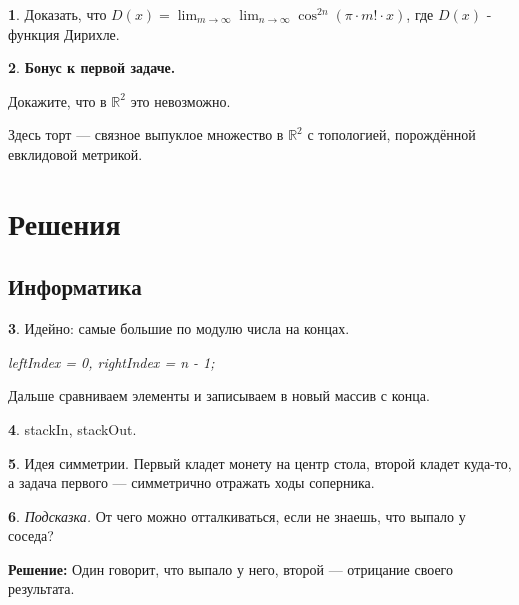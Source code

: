 \documentclass[14pt, a4paper]{extarticle}
\theoremstyle{definition}
\newtheorem{problem}{}
\theoremstyle{definition}
\theoremstyle{remark}
\numberwithin{equation}{section}
\newcommand{\R}{\ensuremath{\mathbb{R}}}
\begin{document}
\begin{problem}
    Доказать, что $D(x) = \displaystyle\lim_{m\to\infty}{\lim_{n\to\infty}
    {\cos^{2n}(\pi \cdot m! \cdot x)}}$, где $D(x)$ - функция Дирихле.
\end{problem}

\begin{problem}
    \textbf{Бонус к первой задаче.}

    Докажите, что в $\R^2$ это невозможно.

    Здесь торт --- связное выпуклое множество в $\R^2$ 
    с топологией, порождённой евклидовой метрикой.
\end{problem}

\newpage
\section*{Решения}
\subsection*{Информатика}
\setcounter{problem}{0}

\begin{problem}
    Идейно: самые большие по модулю числа на концах.

    \textit{leftIndex = 0, rightIndex = n - 1;}

    Дальше сравниваем элементы и записываем в новый массив с конца.
\end{problem}

\begin{problem}
    stackIn, stackOut.
\end{problem}

\begin{problem}
    Идея симметрии. Первый кладет монету на центр стола, второй кладет
    куда-то, а задача первого --- симметрично отражать ходы соперника.
\end{problem}

\begin{problem}
    \textit{Подсказка.} От чего можно отталкиваться, если не знаешь, 
    что выпало у соседа?

    \textbf{Решение:} Один говорит, что выпало у него, второй --- 
    отрицание своего результата.
\end{problem}
\end{document}
